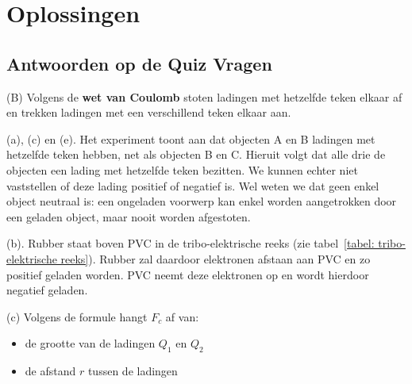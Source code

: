 \newpage
\section{Oplossingen}
\subsection{Antwoorden op de Quiz Vragen}
\begin{oplq}
(B) Volgens de \textbf{wet van Coulomb} stoten ladingen met hetzelfde teken elkaar af en trekken ladingen met een verschillend teken elkaar aan.\\
\end{oplq}

\begin{oplq}
(a), (c) en (e). Het experiment toont aan dat objecten A en B ladingen met hetzelfde teken hebben, net als objecten B en C. Hieruit volgt dat alle drie de objecten een lading met hetzelfde teken bezitten. We kunnen echter niet vaststellen of deze lading positief of negatief is. Wel weten we dat geen enkel object neutraal is: een ongeladen voorwerp kan enkel worden aangetrokken door een geladen object, maar nooit worden afgestoten.
\end{oplq}

\begin{oplq}
(b). Rubber staat boven PVC in de tribo-elektrische reeks (zie tabel~\ref{tabel: tribo-elektrische reeks}). Rubber zal daardoor elektronen afstaan aan PVC en zo positief geladen worden. PVC neemt deze elektronen op en wordt hierdoor negatief geladen. 
\end{oplq}

\begin{oplq}
(c) Volgens de formule hangt $F_{c}$ af van:
\begin{itemize}
\item de grootte van de ladingen $Q_{1}$ en $Q_{2}$  
\item de afstand $r$ tussen de ladingen  
\end{itemize}
\end{oplq}

